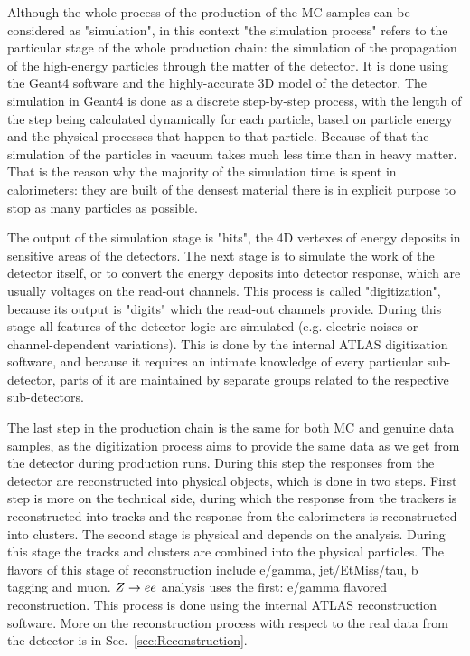 Although the whole process of the production of the MC samples can be considered as "simulation", in this context "the simulation process" refers to the particular stage of the whole production chain: the simulation of the propagation of the high-energy particles through the matter of the detector. It is done using the Geant4 software and the highly-accurate 3D model of the detector. The simulation in Geant4 is done as a discrete step-by-step process, with the length of the step being calculated dynamically for each particle, based on particle energy and the physical processes that happen to that particle. Because of that the simulation of the particles in vacuum takes much less time than in heavy matter. That is the reason why the majority of the simulation time is spent in calorimeters: they are built of the densest material there is in explicit purpose to stop as many particles as possible.

The output of the simulation stage is "hits", the 4D vertexes of energy deposits in sensitive areas of the detectors. The next stage is to simulate the work of the detector itself, or to convert the energy deposits into detector response, which are usually voltages on the read-out channels. This process is called "digitization", because its output is "digits" which the read-out channels provide. During this stage all features of the detector logic are simulated (e.g. electric noises or channel-dependent variations). This is done by the internal ATLAS digitization software, and because it requires an intimate knowledge of every particular sub-detector, parts of it are maintained by separate groups related to the respective sub-detectors.

The last step in the production chain is the same for both MC and genuine data samples, as the digitization process aims to provide the same data as we get from the detector during production runs. During this step the responses from the detector are reconstructed into physical objects, which is done in two steps. First step is more on the technical side, during which the response from the trackers is reconstructed into tracks and the response from the calorimeters is reconstructed into clusters. The second stage is physical and depends on the analysis. During this stage the tracks and clusters are combined into the physical particles. The flavors of this stage of reconstruction include e/gamma, jet/EtMiss/tau, b tagging and muon. $Z \rightarrow ee$ analysis uses the first: e/gamma flavored reconstruction. This process is done using the internal ATLAS reconstruction software. More on the reconstruction process with respect to the real data from the detector is in Sec.~\ref{sec:Reconstruction}.

